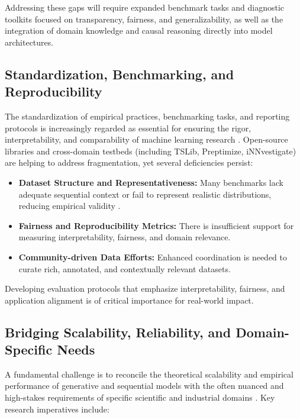 \documentclass[11pt]{article}
\begin{document}
Addressing these gaps will require expanded benchmark tasks and diagnostic toolkits focused on transparency, fairness, and generalizability, as well as the integration of domain knowledge and causal reasoning directly into model architectures.

\subsection{Standardization, Benchmarking, and Reproducibility}
\label{subsec:standardization}

The standardization of empirical practices, benchmarking tasks, and reporting protocols is increasingly regarded as essential for ensuring the rigor, interpretability, and comparability of machine learning research \cite{ref85,ref86,ref87}. Open-source libraries and cross-domain testbeds (including TSLib, Preptimize, iNNvestigate) are helping to address fragmentation, yet several deficiencies persist:

\begin{itemize}
    \item \textbf{Dataset Structure and Representativeness:} Many benchmarks lack adequate sequential context or fail to represent realistic distributions, reducing empirical validity \cite{ref87}.
    \item \textbf{Fairness and Reproducibility Metrics:} There is insufficient support for measuring interpretability, fairness, and domain relevance.
    \item \textbf{Community-driven Data Efforts:} Enhanced coordination is needed to curate rich, annotated, and contextually relevant datasets.
\end{itemize}

Developing evaluation protocols that emphasize interpretability, fairness, and application alignment is of critical importance for real-world impact.

\subsection{Bridging Scalability, Reliability, and Domain-Specific Needs}
\label{subsec:bridging}

A fundamental challenge is to reconcile the theoretical scalability and empirical performance of generative and sequential models with the often nuanced and high-stakes requirements of specific scientific and industrial domains \cite{ref82,ref84,ref86,ref87}. Key research imperatives include:
\end{document}
